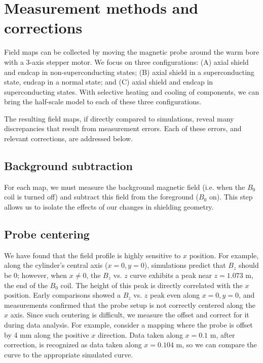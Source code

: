 \documentclass[twocolumn,aps,prb,citeautoscript]{revtex4-1}
\begin{document}
\section{Measurement methods and corrections}

Field maps can be collected by moving the magnetic probe around the warm bore with a 3-axis stepper motor.
We focus on three configurations:
(A) axial shield and endcap in non-superconducting states; (B) axial shield in a superconducting state, endcap
in a normal state; and (C) axial shield and endcap in superconducting states. With selective heating and cooling
of components, we can bring the half-scale model to each of these three configurations.

The resulting field maps, if directly compared to simulations, reveal many discrepancies that result from
measurement errors. Each of these errors, and relevant corrections, are addressed below.

\subsection{Background subtraction}

For each map, we must measure the background magnetic field (i.e. when the $B_0$ coil is turned off) and
subtract this field from the foreground ($B_0$ on). This step allows us to isolate the effects of our changes in
shielding geometry.

\subsection{Probe centering}

We have found that the field profile is highly sensitive to $x$ position. For example, along the cylinder's
central axis ($x=0, y=0$), simulations predict that $B_z$ should be 0; however, when $x\neq0$,
the $B_z$ vs. $z$ curve exhibits
a peak near $z=1.073$ m, the end of the $B_0$ coil. The height of this peak is directly correlated with the $x$
position. Early comparisons showed a $B_z$ vs. $z$ peak even along $x=0, y=0$, and measurements confirmed that
the probe setup is not correctly centered along the $x$ axis. Since such centering is difficult, we measure the
offset and correct for it during data analysis. For example, consider a mapping where the probe is offset by 4 mm
along the positive $x$ direction. Data taken along $x = 0.1$ m, after correction,
is recognized as data taken along $x = 0.104$ m, so we can compare the curve to the appropriate simulated curve.
\end{document}
